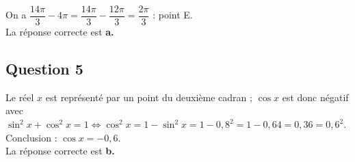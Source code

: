 On a $\dfrac{14\pi}{3} - 4\pi = \dfrac{14\pi}{3} - \dfrac{12\pi}{3} = \dfrac{2\pi}{3}$ : point E.\\
La réponse correcte est \textbf{a.}
	
	\subsection*{Question 5}
	
Le réel $x$ est représenté par un point du deuxième cadran ; $\cos x$ est donc négatif avec $\sin^2 x + \cos^2 x = 1 \Leftrightarrow \cos^2 x = 1 - \sin^2 x = 1 - 0,8^2 = 1 - 0,64 = 0,36 = 0,6^2$. Conclusion : $\cos x = -0,6$.\\
La réponse correcte est \textbf{b.}
	
